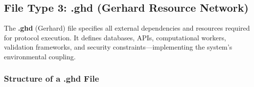 \subsection{File Type 3: .ghd (Gerhard Resource Network)}

\begin{definition}
The \textbf{.ghd} (Gerhard) file specifies all external dependencies and resources required for protocol execution. It defines databases, APIs, computational workers, validation frameworks, and security constraints—implementing the system's environmental coupling.
\end{definition}

\subsubsection{Structure of a .ghd File}

